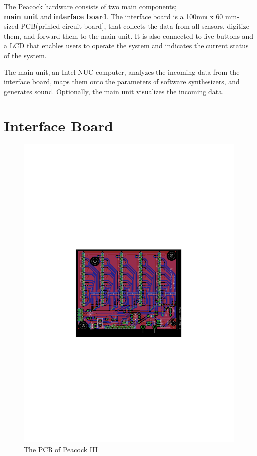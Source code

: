 \documentclass{nime-alternate}
\begin{document}
The Peacock hardware consists of two main components;\\
\textbf{main unit} and \textbf{interface board}. The interface board is a 100mm x 60 mm-sized PCB(printed circuit board), that collects the data from all sensors, digitize them, and forward them to the main unit. It is also connected to five buttons and a LCD that enables users to operate the system and indicates the current status of the system.

The main unit, an Intel NUC computer, analyzes the incoming data from the interface board, maps them onto the parameters of software synthesizers, and generates sound. Optionally, the main unit visualizes the incoming data.

\section{Interface Board} %

\begin{figure}[htbp]
       \begin{center}
              \includegraphics[width=1\columnwidth]{board}
       \end{center}
       \caption{The PCB of Peacock III}
       \label{fig:board}
\end{figure}
\end{document}
